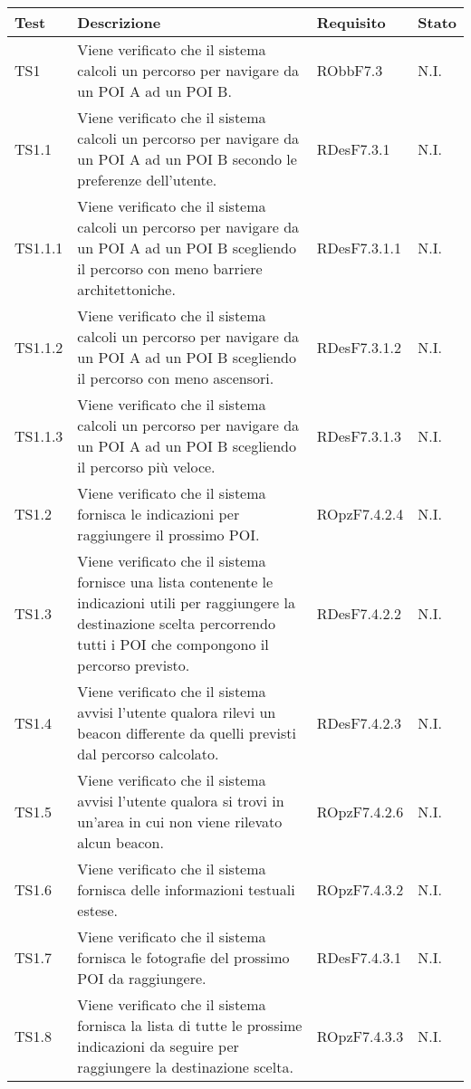 \documentclass[../PianoDiQualifica.tex]{subfiles}
\begin{document}
\begin{appendices}
	\begin{longtabu} to \textwidth {X[0.7] X[2] X[1.3] X}
\toprule
\textbf{Test} & \textbf{Descrizione} & \textbf{Requisito} & \textbf{Stato}\\
\midrule
\endhead
{}
TS1 & Viene verificato che il sistema calcoli un percorso per navigare da un POI A ad un POI B. & RObbF7.3 & N.I. \\ 
\midrule 
TS1.1 & Viene verificato che il sistema calcoli un percorso per navigare da un POI A ad un POI B secondo le preferenze dell'utente. & RDesF7.3.1 & N.I. \\ 
\midrule 
TS1.1.1 & Viene verificato che il sistema calcoli un percorso per navigare da un POI A ad un POI B scegliendo il percorso con meno barriere architettoniche. & RDesF7.3.1.1 & N.I. \\ 
\midrule 
TS1.1.2 & Viene verificato che il sistema calcoli un percorso per navigare da un POI A ad un POI B scegliendo il percorso con meno ascensori. & RDesF7.3.1.2 & N.I. \\ 
\midrule 
TS1.1.3 & Viene verificato che il sistema calcoli un percorso per navigare da un POI A ad un POI B scegliendo il percorso più veloce. & RDesF7.3.1.3 & N.I. \\ 
\midrule 
TS1.2 & Viene verificato che il sistema fornisca le indicazioni per raggiungere il prossimo POI. & ROpzF7.4.2.4 & N.I. \\ 
\midrule 
TS1.3 & Viene verificato che il sistema fornisce una lista contenente le indicazioni utili per raggiungere la destinazione scelta percorrendo tutti i POI che compongono il percorso previsto. & RDesF7.4.2.2 & N.I. \\ 
\midrule 
TS1.4 & Viene verificato che il sistema avvisi l'utente qualora rilevi un beacon differente da quelli previsti dal percorso calcolato. & RDesF7.4.2.3 & N.I. \\ 
\midrule 
TS1.5 & Viene verificato che il sistema avvisi l'utente qualora si trovi in un'area in cui non viene rilevato alcun beacon. & ROpzF7.4.2.6 & N.I. \\ 
\midrule 
TS1.6 & Viene verificato che il sistema fornisca delle informazioni testuali estese. & ROpzF7.4.3.2 & N.I. \\ 
\midrule 
TS1.7 & Viene verificato che il sistema fornisca le fotografie del prossimo POI da raggiungere. & RDesF7.4.3.1 & N.I. \\ 
\midrule 
TS1.8 & Viene verificato che il sistema fornisca la lista di tutte le prossime indicazioni da seguire per raggiungere la destinazione scelta. & ROpzF7.4.3.3 & N.I. \\ 

\end{longtabu}
\end{appendices}
\end{document}
